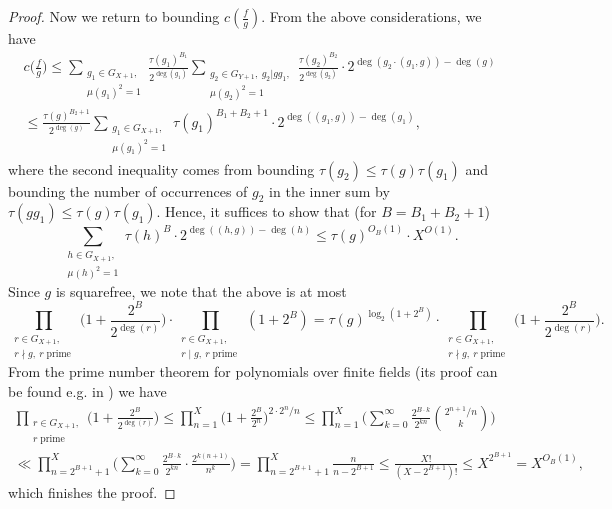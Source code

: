\documentclass[11pt, reqno]{amsart}
\numberwithin{equation}{section}
\newcommand\pprime{\operatorname{prime}}
\begin{document}
\begin{proof}
    Now we return to bounding $c(\frac{f}{g})$. From the above considerations, we have
    \begin{multline*}
        c\Big(\frac{f}{g}\Big)
    \leqslant \sum_{\substack{g_1 \in G_{X+1}, \\ \mu(g_1)^2=1}} \frac{\tau(g_1)^{B_1}}{2^{\deg(g_1)}} \sum_{\substack{g_2 \in G_{Y+1}, \ g_2 | gg_1, \\ \mu(g_2)^2=1}} \frac{\tau(g_2)^{B_2}}{2^{\deg( g_2 )}} \cdot 2^{\deg(g_2 \cdot (g_1, g)) - \deg( g )}
    \\ \leqslant \frac{\tau(g)^{B_2+1}}{2^{\deg( g )}} \sum_{\substack{g_1 \in G_{X+1}, \\ \mu(g_1)^2=1}} \tau(g_1)^{B_1+B_2+1} \cdot 2^{\deg( (g_1, g) ) - \deg( g_1 )},
    \end{multline*}
    where the second inequality comes from bounding $\tau(g_2) \leqslant \tau(g)\tau(g_1)$ and bounding the number of occurrences of $g_2$ in the inner sum by $\tau(gg_1) \leqslant \tau(g)\tau(g_1)$.
    Hence, it suffices to show that (for $B=B_1+B_2+1$)
    $$\sum_{\substack{h \in G_{X+1}, \\ \mu(h)^2=1}} \tau(h)^{B} \cdot 2^{\deg( (h, g) ) - \deg(h)} \leqslant \tau(g)^{O_B(1)} \cdot X^{O(1)}.$$
    Since $g$ is squarefree, we note that the above is at most
    $$\prod_{\substack{r \in G_{X+1}, \\ r \nmid g, \ r \pprime}} \Big( 1 + \frac{2^B}{2^{\deg( r )}} \Big) \cdot \prod_{\substack{r \in G_{X+1}, \\ r \mid g, \ r \pprime}} ( 1 + 2^B) = \tau(g)^{\log_2 (1 + 2^B)} \cdot \prod_{\substack{r \in G_{X+1}, \\ r \nmid g, \ r \pprime}} \Big( 1 + \frac{2^B}{2^{\deg( r )}} \Big).$$
    From the prime number theorem for polynomials over finite fields (its proof can be found e.g. in \cite{pnt_finite_fields}) we have
    \begin{multline*}
        \prod_{\substack{r \in G_{X+1}, \\ r \pprime}} \Big( 1 + \frac{2^B}{2^{\deg( r )}} \Big)
        \leqslant \prod_{n=1}^X \Big( 1 + \frac{2^B}{2^n} \Big)^{2 \cdot 2^n/n}
        \leqslant \prod_{n=1}^X \bigg( \sum_{k=0}^{\infty} \frac{2^{B \cdot k}}{2^{kn}} \binom{2^{n+1}/n}{k} \bigg) \\
        \ll \prod_{n=2^{B+1}+1}^X \bigg( \sum_{k=0}^{\infty} \frac{2^{B \cdot k}}{2^{kn}} \cdot \frac{2^{k(n+1)}}{n^k} \bigg)
        = \prod_{n=2^{B+1}+1}^X \frac{n}{n-2^{B+1}} \leqslant \frac{X!}{(X-2^{B+1})!}\leqslant X^{2^{B+1}}=X^{O_B(1)},
    \end{multline*}
    which finishes the proof.
\end{proof}
\end{document}
